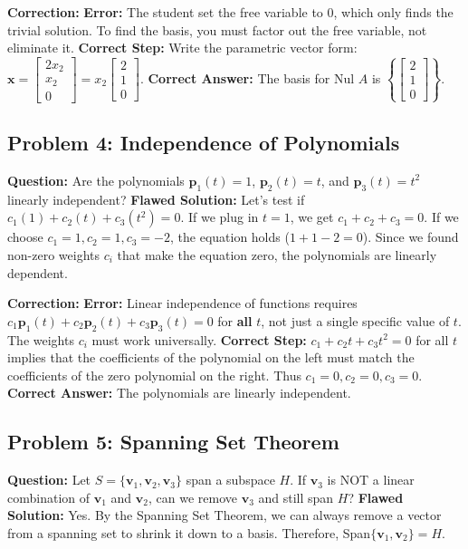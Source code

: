 \documentclass[12pt]{article}
\begin{document}
\textbf{Correction:}
\textbf{Error:} The student set the free variable to 0, which only finds the trivial solution. To find the basis, you must factor out the free variable, not eliminate it.
\textbf{Correct Step:} Write the parametric vector form: $\mathbf{x} = \begin{bmatrix} 2x_2 \\ x_2 \\ 0 \end{bmatrix} = x_2 \begin{bmatrix} 2 \\ 1 \\ 0 \end{bmatrix}$.
\textbf{Correct Answer:} The basis for Nul $A$ is $\left\{ \begin{bmatrix} 2 \\ 1 \\ 0 \end{bmatrix} \right\}$.

\subsection{Problem 4: Independence of Polynomials}
\textbf{Question:} Are the polynomials $\mathbf{p}_1(t) = 1$, $\mathbf{p}_2(t) = t$, and $\mathbf{p}_3(t) = t^2$ linearly independent?
\textbf{Flawed Solution:}
Let's test if $c_1(1) + c_2(t) + c_3(t^2) = 0$.
If we plug in $t = 1$, we get $c_1 + c_2 + c_3 = 0$.
If we choose $c_1 = 1, c_2 = 1, c_3 = -2$, the equation holds ($1 + 1 - 2 = 0$).
Since we found non-zero weights $c_i$ that make the equation zero, the polynomials are linearly dependent.

\textbf{Correction:}
\textbf{Error:} Linear independence of functions requires $c_1\mathbf{p}_1(t) + c_2\mathbf{p}_2(t) + c_3\mathbf{p}_3(t) = 0$ for \textbf{all} $t$, not just a single specific value of $t$. The weights $c_i$ must work universally.
\textbf{Correct Step:} $c_1 + c_2t + c_3t^2 = 0$ for all $t$ implies that the coefficients of the polynomial on the left must match the coefficients of the zero polynomial on the right. Thus $c_1=0, c_2=0, c_3=0$.
\textbf{Correct Answer:} The polynomials are linearly independent.

\subsection{Problem 5: Spanning Set Theorem}
\textbf{Question:} Let $S = \{\mathbf{v}_1, \mathbf{v}_2, \mathbf{v}_3\}$ span a subspace $H$. If $\mathbf{v}_3$ is NOT a linear combination of $\mathbf{v}_1$ and $\mathbf{v}_2$, can we remove $\mathbf{v}_3$ and still span $H$?
\textbf{Flawed Solution:}
Yes. By the Spanning Set Theorem, we can always remove a vector from a spanning set to shrink it down to a basis. Therefore, Span$\{\mathbf{v}_1, \mathbf{v}_2\} = H$.
\end{document}
